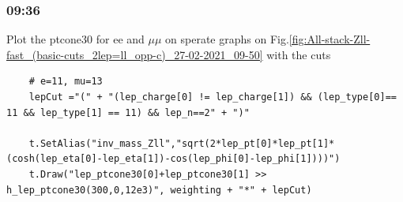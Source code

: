 \subsubsection*{09:36}
Plot the ptcone30 for ee and $\mu\mu$ on sperate graphs on Fig.\ref{fig:All-stack-Zll-fast_(basic-cuts_2lep=ll_opp-c)_27-02-2021_09-50} with the cuts
\begin{lstlisting}
    # e=11, mu=13
    lepCut ="(" + "(lep_charge[0] != lep_charge[1]) && (lep_type[0]== 11 && lep_type[1] == 11) && lep_n==2" + ")"
    
    t.SetAlias("inv_mass_Zll","sqrt(2*lep_pt[0]*lep_pt[1]*(cosh(lep_eta[0]-lep_eta[1])-cos(lep_phi[0]-lep_phi[1])))")
    t.Draw("lep_ptcone30[0]+lep_ptcone30[1] >> h_lep_ptcone30(300,0,12e3)", weighting + "*" + lepCut)
\end{lstlisting}

